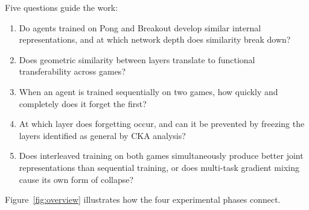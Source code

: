 \documentclass[a4paper]{article}
\begin{document}
Five questions guide the work:

\begin{enumerate}
    \item Do agents trained on Pong and Breakout develop similar internal representations,
    and at which network depth does similarity break down?
    \item Does geometric similarity between layers translate to functional transferability
    across games?
    \item When an agent is trained sequentially on two games, how quickly and completely
    does it forget the first?
    \item At which layer does forgetting occur, and can it be prevented by freezing the
    layers identified as general by CKA analysis?
    \item Does interleaved training on both games simultaneously produce better joint
    representations than sequential training, or does multi-task gradient mixing cause its
    own form of collapse?
\end{enumerate}

Figure~\ref{fig:overview} illustrates how the four experimental phases connect.
\end{document}
